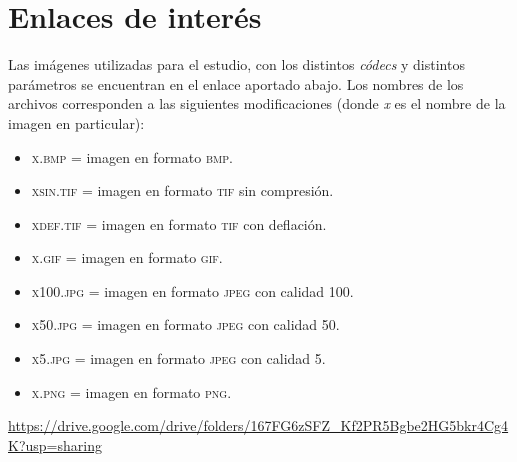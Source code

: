 \documentclass[11pt,a4paper]{article}
\begin{document}
\section{Enlaces de interés}

Las imágenes utilizadas para el estudio, con los distintos \textit{códecs} y distintos parámetros se encuentran en el enlace aportado abajo. Los nombres de los archivos corresponden a las siguientes modificaciones (donde \textit{x} es el nombre de la imagen en particular):

\begin{itemize}
	\item \textsc{x.bmp} = imagen en formato \textsc{bmp}.
	\item \textsc{xsin.tif} = imagen en formato \textsc{tif} sin compresión.
	\item \textsc{xdef.tif} = imagen en formato \textsc{tif} con deflación.
	\item \textsc{x.gif} = imagen en formato \textsc{gif}.
	\item \textsc{x100.jpg} = imagen en formato \textsc{jpeg} con calidad 100.
	\item \textsc{x50.jpg} = imagen en formato \textsc{jpeg} con calidad 50.
	\item \textsc{x5.jpg} = imagen en formato \textsc{jpeg} con calidad 5.
	\item \textsc{x.png} = imagen en formato \textsc{png}.
\end{itemize}

\footnotesize{\textcolor{blue}{\url{https://drive.google.com/drive/folders/167FG6zSFZ_Kf2PR5Bgbe2HG5bkr4Cg4K?usp=sharing}}}
\end{document}
